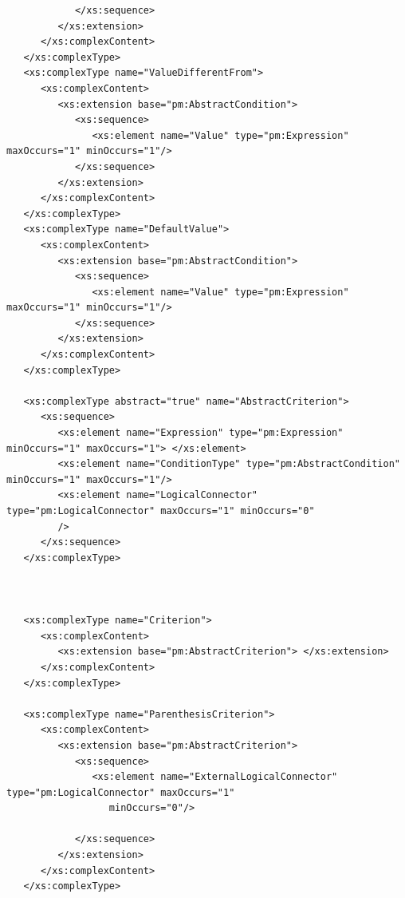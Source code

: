 \documentclass[a4paper,11pt] {ivoa}
\begin{document}
\begin{lstlisting}
            </xs:sequence>
         </xs:extension>
      </xs:complexContent>
   </xs:complexType>
   <xs:complexType name="ValueDifferentFrom">
      <xs:complexContent>
         <xs:extension base="pm:AbstractCondition">
            <xs:sequence>
               <xs:element name="Value" type="pm:Expression" maxOccurs="1" minOccurs="1"/>
            </xs:sequence>
         </xs:extension>
      </xs:complexContent>
   </xs:complexType>
   <xs:complexType name="DefaultValue">
      <xs:complexContent>
         <xs:extension base="pm:AbstractCondition">
            <xs:sequence>
               <xs:element name="Value" type="pm:Expression" maxOccurs="1" minOccurs="1"/>
            </xs:sequence>
         </xs:extension>
      </xs:complexContent>
   </xs:complexType>

   <xs:complexType abstract="true" name="AbstractCriterion">
      <xs:sequence>
         <xs:element name="Expression" type="pm:Expression" minOccurs="1" maxOccurs="1"> </xs:element>
         <xs:element name="ConditionType" type="pm:AbstractCondition" minOccurs="1" maxOccurs="1"/>
         <xs:element name="LogicalConnector" type="pm:LogicalConnector" maxOccurs="1" minOccurs="0"
         />
      </xs:sequence>
   </xs:complexType>



   <xs:complexType name="Criterion">
      <xs:complexContent>
         <xs:extension base="pm:AbstractCriterion"> </xs:extension>
      </xs:complexContent>
   </xs:complexType>

   <xs:complexType name="ParenthesisCriterion">
      <xs:complexContent>
         <xs:extension base="pm:AbstractCriterion">
            <xs:sequence>
               <xs:element name="ExternalLogicalConnector" type="pm:LogicalConnector" maxOccurs="1"
                  minOccurs="0"/>

            </xs:sequence>
         </xs:extension>
      </xs:complexContent>
   </xs:complexType>


\end{lstlisting}
\end{document}
